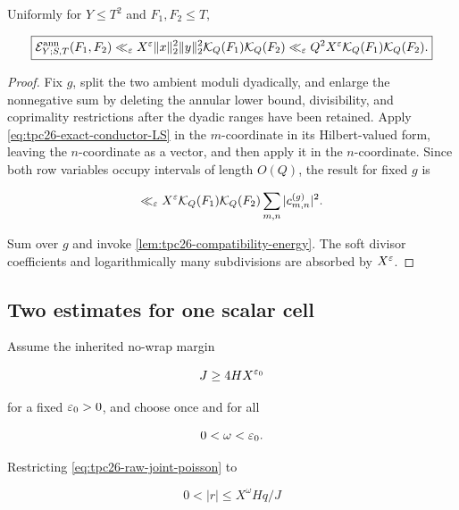 \begin{theorem}
\label{thm:tpc26-symmetric-energy}
Uniformly for \(Y\le T^2\) and \(F_1,F_2\le T\),

\begin{equation}
 \boxed{
 \mathcal E^{\rm ann}_{Y;S,T}(F_1,F_2)
 \ll_\varepsilon X^\varepsilon\|x\|_2^2\|y\|_2^2
 \mathcal K_Q(F_1)\mathcal K_Q(F_2)
 \ll_\varepsilon Q^2X^\varepsilon
 \mathcal K_Q(F_1)\mathcal K_Q(F_2).}
 \label{eq:tpc26-symmetric-energy}
\end{equation}
\end{theorem}

\begin{proof}
Fix \(g\), split the two ambient moduli dyadically, and enlarge the
nonnegative sum by deleting the annular lower bound, divisibility, and
coprimality restrictions after the dyadic ranges have been retained.
Apply \eqref{eq:tpc26-exact-conductor-LS} in the \(m\)-coordinate in
its Hilbert-valued form, leaving the \(n\)-coordinate as a vector, and
then apply it in the \(n\)-coordinate.  Since both row variables occupy
intervals of length \(O(Q)\), the result for fixed \(g\) is

\[
 \ll_\varepsilon X^\varepsilon
 \mathcal K_Q(F_1)\mathcal K_Q(F_2)
 \sum_{m,n}|c_{m,n}^{(g)}|^2.
\]

Sum over \(g\) and invoke
\cref{lem:tpc26-compatibility-energy}.  The soft divisor coefficients
and logarithmically many subdivisions are absorbed by \(X^\varepsilon\).
\end{proof}

\subsection{Two estimates for one scalar cell}

Assume the inherited no-wrap margin

\begin{equation}
 J\ge4HX^{\varepsilon_0}
 \label{eq:tpc26-no-wrap}
\end{equation}

for a fixed \(\varepsilon_0>0\), and choose once and for all

\begin{equation}
 0<\omega<\varepsilon_0.
 \label{eq:tpc26-omega}
\end{equation}

Restricting \eqref{eq:tpc26-raw-joint-poisson} to

\begin{equation}
 0<|r|\le X^\omega Hq/J
 \label{eq:tpc26-retained-frequency}
\end{equation}

